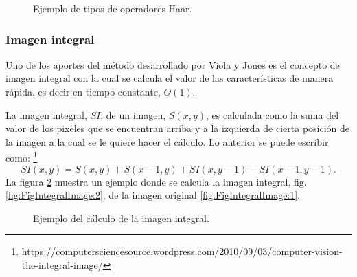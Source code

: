 \begin{figure}[h!]
\caption{Ejemplo de tipos de operadores Haar.} \label{fig:haarFeatures}
\end{figure}


\subsubsection{Imagen integral}\label{sssec:IntegralImage} 

Uno de los aportes del método desarrollado por Viola y Jones es el concepto de imagen integral con la cual se calcula el valor de las características de manera rápida, es decir en tiempo constante, $O(1)$.  

La imagen integral, $SI$, de un imagen, $S(x,y)$, es calculada como la suma del valor de los pixeles que se encuentran arriba y a la izquierda de cierta posición de la imagen a la cual se le quiere hacer el cálculo. Lo anterior se puede escribir como: \footnote{https://computersciencesource.wordpress.com/2010/09/03/computer-vision-the-integral-image/}   
\begin{equation}
SI(x,y)=S(x,y) + S(x-1,y) + SI(x,y-1)-SI(x-1,y-1).
\end{equation}   
La figura \ref{fig:FigIntegralImage} muestra un  ejemplo donde se calcula la imagen integral, fig. \ref{fig:FigIntegralImage:2}, de la imagen original \ref{fig:FigIntegralImage:1}.
\begin{figure}[h!]
\centering
{} \qquad
{}
\caption{Ejemplo del cálculo de la imagen integral.} 
\label{fig:FigIntegralImage}
\end{figure}

